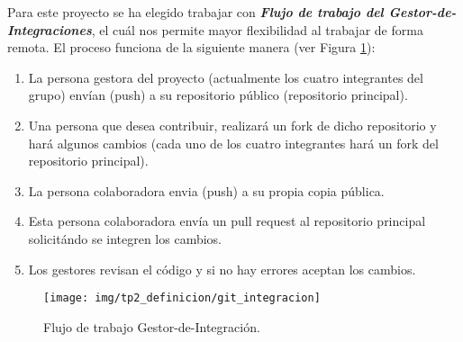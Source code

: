 Para este proyecto se ha elegido trabajar con \textbf{\textit{Flujo de trabajo del Gestor-de-Integraciones}}, el cuál nos permite mayor flexibilidad al trabajar de forma remota.  El proceso funciona de la siguiente manera (ver Figura \ref{git_integracion}):
	\begin{enumerate}
		\item    La persona gestora del proyecto (actualmente los cuatro integrantes del grupo) envían (push) a su repositorio público (repositorio principal).
		\item    Una persona que desea contribuir, realizará un fork de dicho repositorio y hará algunos cambios (cada uno de los cuatro integrantes hará un fork del repositorio principal).
		\item    La persona colaboradora envia (push) a su propia copia pública.
		\item    Esta persona colaboradora envía un pull request al repositorio principal solicitándo se integren los cambios.
		\item    Los gestores revisan el código y si no hay errores aceptan los cambios.
	\end{enumerate}
\begin{figure}
  \centering
  \texttt{[image: img/tp2\_definicion/git\_integracion]}
  \caption{Flujo de trabajo Gestor-de-Integración.}
  \label{git_integracion}
\end{figure}

